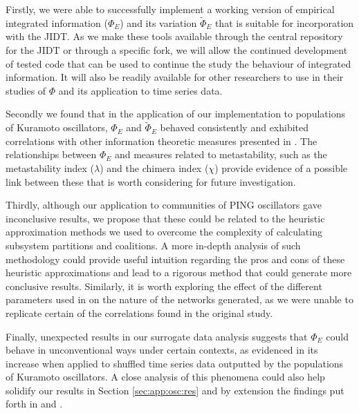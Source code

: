 \documentclass[a4paper,11pt]{article}
\begin{document}
Firstly, we were able to successfully implement a working version of empirical integrated information ($\Phi_E$) and its variation $\widetilde{\Phi}_E$ that is suitable for incorporation with the JIDT. As we make these tools available through the central repository for the JIDT or through a specific fork, we will allow the continued development of tested code that can be used to continue the study the behaviour of integrated information. It will also be readily available for other researchers to use in their studies of $\Phi$ and its application to time series data.

Secondly we found that in the application of our implementation to populations of Kuramoto oscillators, $\Phi_E$ and $\widetilde{\Phi}_E$ behaved consistently and exhibited correlations with other information theoretic measures presented in \cite{Shanahan2010}. The relationships between $\Phi_E$ and measures related to metastability, such as the metastability index ($\lambda$) and the chimera index ($\chi$) provide evidence of a possible link between these that is worth considering for future investigation.

Thirdly, although our application to communities of PING oscillators gave inconclusive results, we propose that these could be related to the heuristic approximation methods we used to overcome the complexity of calculating subsystem partitions and coalitions. A more in-depth analysis of such methodology could provide useful intuition regarding the pros and cons of these heuristic approximations and lead to a rigorous method that could generate more conclusive results. Similarly, it is worth exploring the effect of the different parameters used in \cite{Bhowmik2013} on the nature of the networks generated, as we were unable to replicate certain of the correlations found in the original study.

Finally, unexpected results in our surrogate data analysis suggests that $\Phi_E$ could behave in unconventional ways under certain contexts, as evidenced in its increase when applied to shuffled time series data outputted by the populations of Kuramoto oscillators. A close analysis of this phenomena could also help solidify our results in Section \ref{sec:app:osc:res} and by extension the findings put forth in \cite{Shanahan2010} and \cite{Bhowmik2013}.

\clearpage


{}
\clearpage
\end{document}
